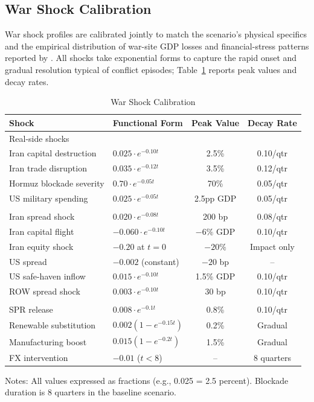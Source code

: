 \documentclass[12pt]{article}
\begin{document}
\subsection{War Shock Calibration}

War shock profiles are calibrated jointly to match the scenario's physical specifics and the empirical distribution of war-site GDP losses and financial-stress patterns reported by \citet{federle2026price}. All shocks take exponential forms to capture the rapid onset and gradual resolution typical of conflict episodes; Table~\ref{tab:shocks} reports peak values and decay rates.

\begin{table}[H]
\centering
\small
\begin{threeparttable}
\caption{War Shock Calibration}
\label{tab:shocks}
\begin{tabular}{@{}llcc@{}}
\toprule
Shock & Functional Form & Peak Value & Decay Rate \\
\midrule
\multicolumn{4}{l}{Real-side shocks} \\
Iran capital destruction & $0.025 \cdot e^{-0.10t}$ & 2.5\% & 0.10/qtr \\
Iran trade disruption & $0.035 \cdot e^{-0.12t}$ & 3.5\% & 0.12/qtr \\
Hormuz blockade severity & $0.70 \cdot e^{-0.05t}$ & 70\% & 0.05/qtr \\
US military spending & $0.025 \cdot e^{-0.05t}$ & 2.5pp GDP & 0.05/qtr \\
\addlinespace
\multicolumn{4}{l}{Financial shocks} \\
Iran spread shock & $0.020 \cdot e^{-0.08t}$ & 200 bp & 0.08/qtr \\
Iran capital flight & $-0.060 \cdot e^{-0.10t}$ & $-6\%$ GDP & 0.10/qtr \\
Iran equity shock & $-0.20$ at $t=0$ & $-20\%$ & Impact only \\
US spread & $-0.002$ (constant) & $-20$ bp & -- \\
US safe-haven inflow & $0.015 \cdot e^{-0.10t}$ & 1.5\% GDP & 0.10/qtr \\
ROW spread shock & $0.003 \cdot e^{-0.10t}$ & 30 bp & 0.10/qtr \\
\addlinespace
\multicolumn{4}{l}{China stabilization} \\
SPR release & $0.008 \cdot e^{-0.1t}$ & 0.8\% & 0.10/qtr \\
Renewable substitution & $0.002(1-e^{-0.15t})$ & 0.2\% & Gradual \\
Manufacturing boost & $0.015(1-e^{-0.2t})$ & 1.5\% & Gradual \\
FX intervention & $-0.01$ ($t < 8$) & -- & 8 quarters \\
\bottomrule
\end{tabular}
\begin{tablenotes}[flushleft]
\small
\item Notes: All values expressed as fractions (e.g., 0.025 = 2.5 percent). Blockade duration is 8 quarters in the baseline scenario.
\end{tablenotes}
\end{threeparttable}
\end{table}
\end{document}
